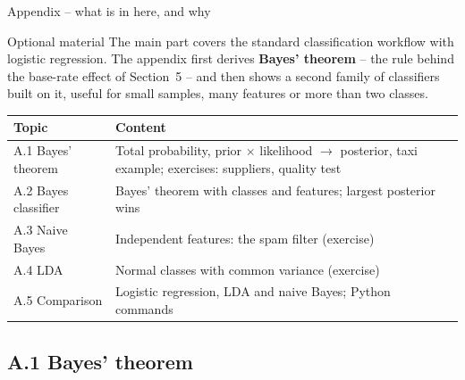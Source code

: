 \documentclass[aspectratio=169,11pt]{beamer}
\begin{document}
\begin{frame}{Appendix -- what is in here, and why}
  \begin{block}{Optional material}
    The main part covers the standard classification workflow with logistic
    regression. The appendix first derives \textbf{Bayes' theorem} -- the
    rule behind the base-rate effect of Section~5 -- and then shows a second
    family of classifiers built on it, useful for small samples, many
    features or more than two classes.
  \end{block}
  \begin{center}
    \small
    \renewcommand{\arraystretch}{1.2}
    \begin{tabular}{@{}l>{\raggedright\arraybackslash}p{9.6cm}@{}}
      \toprule
      \textbf{Topic} & \textbf{Content}\\
      \midrule
      A.1 Bayes' theorem & Total probability, prior $\times$ likelihood $\to$ posterior, taxi example; exercises: suppliers, quality test\\
      A.2 Bayes classifier & Bayes' theorem with classes and features; largest posterior wins\\
      A.3 Naive Bayes & Independent features: the spam filter (exercise)\\
      A.4 LDA & Normal classes with common variance (exercise)\\
      A.5 Comparison & Logistic regression, LDA and naive Bayes; Python commands\\
      \bottomrule
    \end{tabular}
  \end{center}
\end{frame}

\subsection{A.1 Bayes' theorem}
\end{document}
